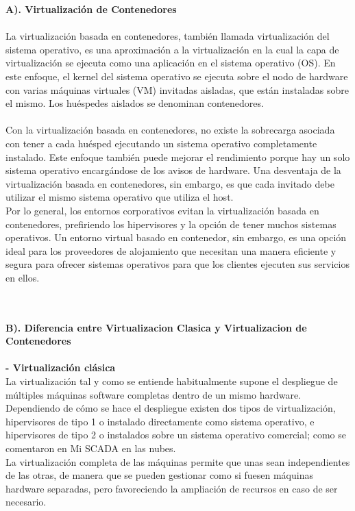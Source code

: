 \documentclass[twoside,twocolumn]{article}
\begin{document}
\begin{flushright}
\begin{itemize}
 \textbf{A). Virtualización de Contenedores }\\
\textbf{}\\
La virtualización basada en contenedores, también llamada virtualización del sistema operativo, es una aproximación a la virtualización en la cual la capa de virtualización se ejecuta como una aplicación en el sistema operativo (OS). En este enfoque, el kernel del sistema operativo se ejecuta sobre el nodo de hardware con varias máquinas virtuales (VM) invitadas aisladas, que están instaladas sobre el mismo. Los huéspedes aislados se denominan contenedores.\textbf{}\\
\textbf{}\\
Con la virtualización basada en contenedores, no existe la sobrecarga asociada con tener a cada huésped ejecutando un sistema operativo completamente instalado. Este enfoque también puede mejorar el rendimiento porque hay un solo sistema operativo encargándose de los avisos de hardware. Una desventaja de la virtualización basada en contenedores, sin embargo, es que cada invitado debe utilizar el mismo sistema operativo que utiliza el host.
\textbf{}\\
Por lo general, los entornos corporativos evitan la virtualización basada en contenedores, prefiriendo los hipervisores y la opción de tener muchos sistemas operativos. Un entorno virtual basado en contenedor, sin embargo, es una opción ideal para los proveedores de alojamiento que necesitan una manera eficiente y segura para ofrecer sistemas operativos para que los clientes ejecuten sus servicios en ellos.

\textbf{}\\
\textbf{}\\
 \textbf{B). Diferencia entre Virtualizacion Clasica y Virtualizacion de Contenedores}\\

\textbf{}\\
\textbf{- Virtualización clásica}\\
La virtualización tal y como se entiende habitualmente supone el despliegue de múltiples máquinas software completas dentro de un mismo hardware. Dependiendo de cómo se hace el despliegue existen dos tipos de virtualización, hipervisores de tipo 1 o instalado directamente como sistema operativo, e hipervisores de tipo 2 o instalados sobre un sistema operativo comercial; como se comentaron en Mi SCADA en las nubes.\textbf{}\\
La virtualización completa de las máquinas permite que unas sean independientes de las otras, de manera que se pueden gestionar como si fuesen máquinas hardware separadas, pero favoreciendo la ampliación de recursos en caso de ser necesario.
\textbf{}\\


\end{itemize}
\end{flushright}
\end{document}

